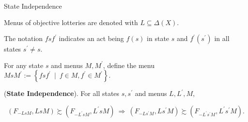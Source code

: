 \documentclass[usenames,dvipsnames,aspectratio=169,11pt, envcountsect, handout]{beamer}
\begin{document}
\begin{frame}{State Independence}

	Menus of objective lotteries are denoted with \( L \subseteq \Delta \left( X \right) \).

	\vfill

	The notation \( f s f^{\prime} \) indicates an act being \( f \left( s \right) \) in state \( s \) and \( f^{\prime} \left( s^{\prime} \right) \) in all states \( s^{\prime} \neq s \).

	\vfill

	For any state \( s \) and menus \( M, M^{\prime} \), define the menu \( M s M^{\prime} := \left\{ f s f^{\prime} \: \mid \: f \in M, f^{\prime} \in M^{\prime} \right\} \). \pause

	\vfill

	\begin{axiom}\label{ax:sindependence}

		(\textbf{\textbf{State Independence}}). For all states \( s, s^{\prime} \) and menus \( L, L^{\prime}, M \),

		\[
			\left( F_{-L s M}, L s M \right) \succsim \left( F_{-L^{\prime} s M}, L^{\prime} s M \right) \: \Rightarrow \: \left( F_{-L {s^{\prime}} M}, L {s^{\prime}} M \right) \succsim \left( F_{-L^{\prime} {s^{\prime}} M}, L^{\prime} {s^{\prime}} M \right) .
		\]

	\end{axiom}
\end{frame}
\end{document}
